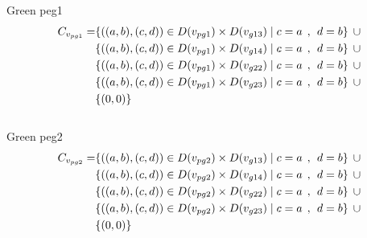  Green peg1 
\begin{align*}
C_{v_{pg1}} = &\{((a,b),(c,d))\in D(v_{pg1}) \times D(v_{g13})\mid c = a \hspace{1ex} , \hspace{1ex}  d = b\} \hspace{1ex} \cup 
\\& \{((a,b),(c,d))\in D(v_{pg1}) \times D(v_{g14})\mid c = a \hspace{1ex} , \hspace{1ex}  d = b\} \hspace{1ex} \cup 
\\&\{ ((a,b),(c,d))\in D(v_{pg1}) \times D(v_{g22})\mid c = a \hspace{1ex} , \hspace{1ex}  d = b\}\hspace{1ex} \cup 
\\&\{ ((a,b),(c,d))\in D(v_{pg1}) \times D(v_{g23})\mid c = a \hspace{1ex} , \hspace{1ex}  d = b\} \hspace{1ex} \cup 
\\&\{(0,0)\}
\end{align*}
\\ Green peg2 
\begin{align*}
C_{v_{pg2}} = &\{((a,b),(c,d))\in D(v_{pg2}) \times D(v_{g13})\mid c = a \hspace{1ex} , \hspace{1ex}  d = b\} \hspace{1ex} \cup 
\\&\{((a,b),(c,d))\in D(v_{pg2}) \times D(v_{g14})\mid c = a \hspace{1ex} , \hspace{1ex}  d = b\} \hspace{1ex} \cup 
\\&\{ ((a,b),(c,d))\in D(v_{pg2}) \times D(v_{g22})\mid c = a \hspace{1ex} , \hspace{1ex}  d = b\}\hspace{1ex} \cup 
\\&\{ ((a,b),(c,d))\in D(v_{pg2}) \times D(v_{g23})\mid c = a \hspace{1ex} , \hspace{1ex}  d = b\} \hspace{1ex} \cup 
\\&\{(0,0)\}
\end{align*}
